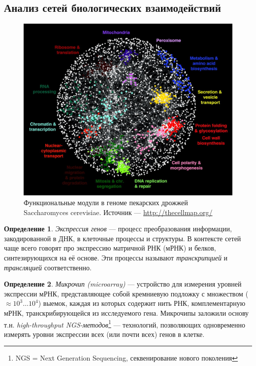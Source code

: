 \documentclass[11pt,a4paper]{report}
\theoremstyle{definition}
\theoremstyle{definition}
\theoremstyle{definition}
\newtheorem{definition}{Определение}[section]
\begin{document}
	\subsection{Анализ сетей биологических взаимодействий}
		\begin{figure}[!hbtp]
		\includegraphics[width=\textwidth]{./img/yeast_interactome.jpg}
		\caption{Функциональные модули в геноме пекарских дрожжей Saccharomyces cerevisiae. \newline Источник — \href{http://thecellmap.org/}{http://thecellmap.org/}}
	\end{figure}
	\begin{definition}
		\textit{Экспрессия генов} — процесс преобразования информации, закодированной в ДНК, в клеточные процессы и структуры. В контексте сетей чаще всего говорят про экспрессию матричной РНК (мРНК) и белков, синтезирующихся на её основе. Эти процессы называют \textit{транскрипцией} и \textit{трансляцией} соответственно.
	\end{definition}
	\begin{definition}
		\textit{Микрочип (microarray)} — устройство для измерения уровней экспрессии мРНК, представляющее собой кремниевую подложку с множеством ($\approx 10^3\ldots10^4$) выемок, каждая из которых содержит нить РНК, комплементарную мРНК, транскрибирующейся из исследуемого гена. Микрочипы заложили основу т.н. \textit{high-throughput NGS-методов}\footnote{NGS = Next Generation Sequencing, секвенирование нового поколения} — технологий, позволяющих одновременно измерять уровни экспрессии всех (или почти всех) генов в клетке.  
	\end{definition}
\end{document}
